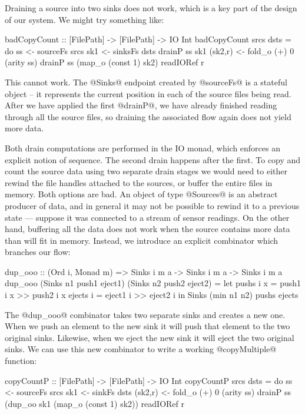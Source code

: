 Draining a source into two sinks does not work, which is a key part of the design of our system. We might try something like:

\begin{code}
badCopyCount :: [FilePath] -> [FilePath] -> IO Int
badCopyCount srcs dsts
 = do  ss      <- sourceFs srcs
       sk1     <- sinksFs  dsts
       drainP ss sk1
       (sk2,r) <- fold_o (+) 0 (arity ss)
       drainP ss (map_o (const 1) sk2)
       readIORef r
\end{code}

This cannot work. The @Sinks@ endpoint created by @sourceFs@ is a stateful object -- it represents the current position in each of the source files being read. After we have applied the first @drainP@, we have already finished reading through all the source files, so draining the associated flow again does not yield more data. 

Both drain computations are performed in the IO monad, which enforces an explicit notion of sequence. The second drain happens after the first. To copy and count the source data using two separate drain stages we would need to either rewind the file handles attached to the sources, or buffer the entire files in memory. Both options are bad. An object of type @Sources@ is an abstract producer of data, and in general it may not be possible to rewind it to a previous state --- suppose it was connected to a stream of sensor readings. On the other hand, buffering all the data does not work when the source contains more data than will fit in memory. Instead, we introduce an explicit combinator which branches our flow:

\begin{code}
dup_ooo :: (Ord i, Monad m)
       => Sinks i m a -> Sinks i m a -> Sinks i m a
dup_ooo (Sinks n1 push1 eject1) 
        (Sinks n2 push2 eject2)
 = let pushs  i x = push1 i x >> push2 i x
       ejects i   = eject1 i  >> eject2 i
   in  Sinks (min n1 n2) pushs ejects
\end{code}

The @dup_ooo@ combinator takes two separate sinks and creates a new one. When we push an element to the new sink it will push that element to the two original sinks. Likewise, when we eject the new sink it will eject the two original sinks. We can use this new combinator to write a working @copyMultiple@ function:

\begin{code}
copyCountP :: [FilePath] -> [FilePath] -> IO Int
copyCountP srcs dsts
 = do  ss      <- sourceFs srcs
       sk1     <- sinkFs   dsts
       (sk2,r) <- fold_o (+) 0 (arity ss)
       drainP ss (dup_oo sk1 (map_o (const 1) sk2))
       readIORef r
\end{code}

